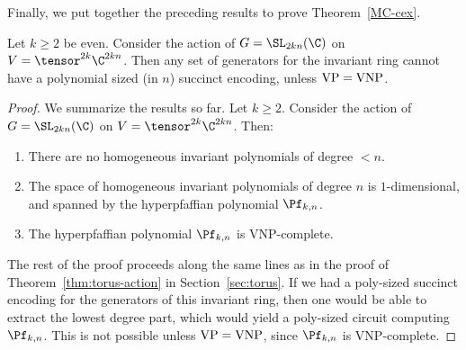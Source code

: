 \noindent
Finally, we put together the preceding results to prove Theorem~\ref{MC-cex}.

\begin{theorem}
Let $k \geq 2$ be even.
Consider the action of $G = \SL_{2kn}(\C)$ on $V = \tensor^{2k} \C^{2kn}$. Then any set of generators for the invariant ring cannot have a polynomial sized (in $n$) succinct encoding, unless ${\rm VP = VNP}$.
\end{theorem}
\begin{proof}

We summarize the results so far. Let $k \geq 2$. Consider the action of $G = \SL_{2kn}(\C)$ on $V = \tensor^{2k} \C^{2kn}$. Then:

\begin{enumerate}
\item There are no homogeneous invariant polynomials of degree $< n$.

\item The space of homogeneous invariant polynomials of degree $n$ is $1$-dimensional, and spanned by the hyperpfaffian polynomial $\Pf_{k,n}$.

\item The hyperpfaffian polynomial $\Pf_{k,n}$ is VNP-complete.
\end{enumerate}
The rest of the proof proceeds along the same lines as in the proof of Theorem~\ref{thm:torus-action} in Section~\ref{sec:torus}. If we had a poly-sized succinct encoding for the generators of this invariant ring, then one would be able to extract the lowest degree part, which would yield a poly-sized circuit computing $\Pf_{k,n}$.
This is not possible unless ${\rm VP = VNP}$, since $\Pf_{k,n}$ is VNP-complete.
\end{proof}



